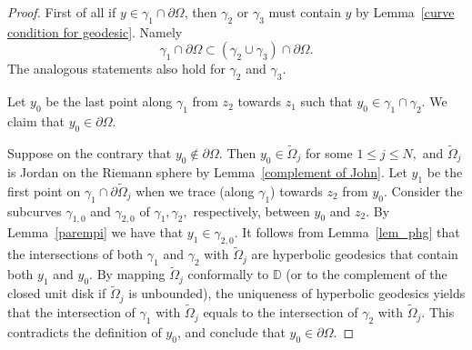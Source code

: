\documentclass[reqno,11pt]{amsart}
\def\wz{\widetilde}
\numberwithin{equation}{section}
\theoremstyle{remark}
\begin{document}
\begin{proof}
First of all if $y\in \gamma_1\cap \partial \Omega$, 
then $\gamma_2$ or $\gamma_3$ must contain $y$ by 
Lemma~\ref{curve condition for geodesic}. Namely 
\begin{equation}\label{inclusion}
\gamma_1\cap \partial \Omega \subset (\gamma_2\cup \gamma_3) \cap \partial \Omega.
\end{equation}
The analogous statements also hold for $\gamma_2$ and $\gamma_3$. 


Let $y_0$ be the last point along $\gamma_1$ from $z_2$ towards $z_1$
such that $y_0\in \gamma_1\cap\gamma_2$. We claim that 
$y_0\in \partial \Omega.$

Suppose on the contrary that $y_0\notin \partial \Omega.$ Then 
$y_0\in \wz \Omega_j$
for some $1\le j \le N,$ and $\wz \Omega_j$ is Jordan on the Riemann sphere by Lemma~\ref{complement of John}.
Let $y_1$ be the first point on $\gamma_1\cap
\partial \wz \Omega_j$ when we trace (along $\gamma_1$) towards $z_2$  from $y_0.$ 
Consider the
subcurves $\gamma_{1,0}$ and $\gamma_{2,0}$ of $\gamma_1,\gamma_2,$ respectively,
between $y_0$ and $z_2.$ By Lemma~\ref{parempi} we have that $y_1\in \gamma_{2,0}.$
It follows from Lemma~\ref{lem_phg} that the intersections of both $\gamma_1$
and $\gamma_2$ with  $\wz \Omega_j$ are hyperbolic geodesics that contain
both $y_1$ and $y_0.$ By mapping $\wz \Omega_j$ conformally to $\mathbb D$ 
 (or to the complement of the closed
unit disk if $\wz \Omega_j$ is unbounded), the 
uniqueness of hyperbolic 
geodesics yields that the intersection of $\gamma_1$ with $\wz \Omega_j$
equals to the intersection of $\gamma_2$ with $\wz \Omega_j.$ This contradicts
the definition of $y_0$, and conclude that $y_0\in \partial \Omega$.  


\end{proof}
\end{document}
